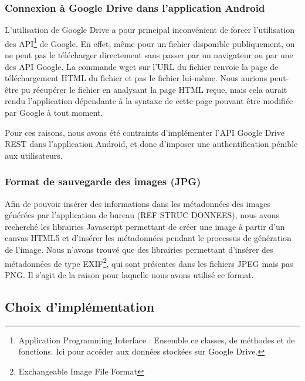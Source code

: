 \subsubsection{Connexion à Google Drive dans l'application Android}
\par
L'utilisation de Google Drive a pour principal inconvénient de forcer l'utilisation des API\footnote{Application Programming Interface : Ensemble ce classes, de méthodes et de fonctions. Ici pour accéder aux données stockées sur Google Drive.} de Google. En effet, même pour un fichier disponible publiquement, on ne peut pas le télécharger directement sans passer par un navigateur ou par une des API Google. La commande wget sur l'URL du fichier renvoie la page de téléchargement HTML du fichier et pas le fichier lui-même. Nous aurions peut-être pu récupérer le fichier en analysant la page HTML reçue, mais cela aurait rendu l'application dépendante à la syntaxe de cette page pouvant être modifiée par Google à tout moment.
\par
Pour ces raisons, nous avons été contraints d'implémenter l'API Google Drive REST dans l'application Android, et donc d'imposer une authentification pénible aux utilisateurs.

\subsubsection{Format de sauvegarde des images (JPG)}
\par
Afin de pouvoir insérer des informations dans les métadonnées des images générées par l'application de bureau (REF STRUC DONNEES), nous avons recherché les librairies Javascript permettant de créer une image à partir d'un canvas HTML5 et d'insérer les métadonnées pendant le processus de génération de l'image. Nous n'avons trouvé que des librairies permettant d'insérer des métadonnées de type EXIF\footnote{Exchangeable Image File Format}, qui sont présentes dans les fichiers JPEG mais pas PNG. Il s'agit de la raison pour laquelle nous avons utilisé ce format.



\subsection{Choix d'implémentation}


